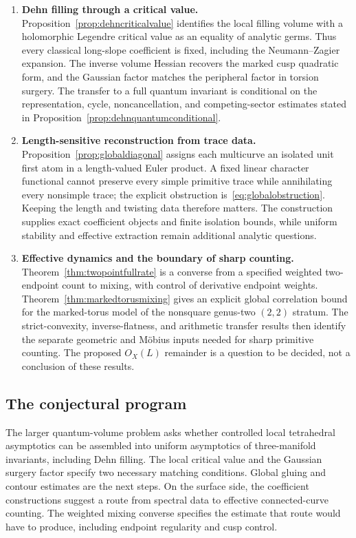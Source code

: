 \documentclass[11pt,a4paper]{article}
\numberwithin{equation}{section}
\theoremstyle{definition}
\theoremstyle{remark}
\begin{document}
\begin{enumerate}[leftmargin=*,label=\textbf{\arabic*.}]
\item \textbf{Dehn filling through a critical value.}
Proposition~\ref{prop:dehncriticalvalue} identifies the local filling
volume with a holomorphic Legendre critical value as an equality of
analytic germs. Thus every classical long-slope coefficient is fixed,
including the Neumann--Zagier expansion. The inverse volume Hessian
recovers the marked cusp quadratic form, and the Gaussian factor
matches the peripheral factor in torsion surgery. The transfer to a
full quantum invariant is conditional on the representation, cycle,
noncancellation, and competing-sector estimates stated in
Proposition~\ref{prop:dehnquantumconditional}.

\item \textbf{Length-sensitive reconstruction from trace data.}
Proposition~\ref{prop:globaldiagonal} assigns each multicurve an
isolated unit first atom in a length-valued Euler product. A fixed
linear character functional cannot preserve every simple primitive
trace while annihilating every nonsimple trace; the explicit obstruction
is~\eqref{eq:globalobstruction}. Keeping the length and twisting data
therefore matters. The construction supplies exact coefficient objects
and finite isolation bounds, while uniform stability and effective
extraction remain additional analytic questions.

\item \textbf{Effective dynamics and the boundary of sharp counting.}
Theorem~\ref{thm:twopointfullrate} is a converse from a specified weighted
two-endpoint count to mixing, with control of derivative endpoint
weights. Theorem~\ref{thm:markedtorusmixing} gives an explicit global
correlation bound for the marked-torus model of the nonsquare genus-two
$(2,2)$ stratum. The strict-convexity, inverse-flatness, and arithmetic
transfer results then identify the separate geometric and M\"obius
inputs needed for sharp primitive counting. The proposed $O_X(L)$
remainder is a question to be decided, not a conclusion of these results.
\end{enumerate}

\subsection*{The conjectural program}

The larger quantum-volume problem asks whether controlled local
tetrahedral asymptotics can be assembled into uniform asymptotics of
three-manifold invariants, including Dehn filling. The local critical
value and the Gaussian surgery factor specify two necessary matching
conditions. Global gluing and contour estimates are the next steps.
On the surface side, the coefficient constructions suggest a route from
spectral data to effective connected-curve counting. The weighted
mixing converse specifies the estimate that route would have to produce,
including endpoint regularity and cusp control.
\end{document}
